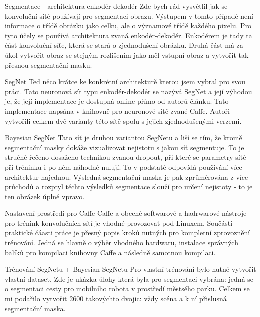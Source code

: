 \documentclass[aspectratio=1610]{beamer}
\begin{document}
\begin{frame}{Segmentace - architektura enkodér-dekodér}
Zde bych rád vysvětlil jak se konvoluční sítě používají pro segmentaci obrazu. Výstupem v tomto případě není informace o třídě obrázku jako celku, ale o významové třídě každého pixelu. Pro tyto účely se používá architektura zvaná enkodér-dekodér. Enkodérem je tady ta část konvoluční síťe, která se stará o zjednodušení obrázku. Druhá část má za úkol vytvořit obraz se stejným rozlišením jako měl vstupní obraz a vytvořit tak přesnou segmentační masku. 
\end{frame}
\begin{frame}{SegNet}
Teď něco krátce ke konkrétní architekturě kterou jsem vybral pro svou práci. Tato neuronová sít typu enkodér-dekodér se nazývá SegNet a její výhodou je, že její implementace je dostupná online přímo od autorů článku. Tato implementace napsána v knihovně pro neuronové sítě zvané Caffe. Autoři vytvořili celkem dvě varianty této sítě spolu s jejich zjednodušenými verzemi.
\end{frame}
\begin{frame}{Bayesian SegNet}
Tato síť je druhou variantou SegNetu a liší se tím, že kromě segmentační masky dokáže vizualizovat nejistotu s jakou síť segmentuje. To je stručně řečeno dosaženo technikou zvanou dropout, při které se parametry sítě při tréninku i po něm náhodně nulují. To v podstatě odpovídá používání více architektur najednou. Výsledná segmentační maska je pak zprůměrována z více průchodů a rozptyl těchto výsledků segmentace slouží pro určení nejistoty - to je ten obrázek úplně vpravo.
\end{frame}
\begin{frame}{Nastavení prostředí pro Caffe}
Caffe a obecně softwarové a hadrwarové nástroje pro trénink konvolučních sítí je vhodné provozovat pod Linuxem. Součástí praktické čáasti práce je přesný popis kroků nutných pro kompletní zprovoznění trénování. Jedná se hlavně o výběr vhodného hardwaru, instalace správných balíků pro kompilaci knihovny Caffe a následně samotnou kompilaci.
\end{frame}
\begin{frame}{Trénování SegNetu + Bayesian SegNetu}
Pro vlastní trénování bylo nutné vytvořit vlastní dataset. Zde je ukázka úlohy která byla pro segmentaci vybrána: jedná se o segmentaci cesty pro mobilního robota v prostředí městsého parku. Celkem se mi podařilo vytvořit 2600 takovýchto dvojic: vždy scéna a k ní přislusná segmentační maska.  
\end{frame}
\end{document}
